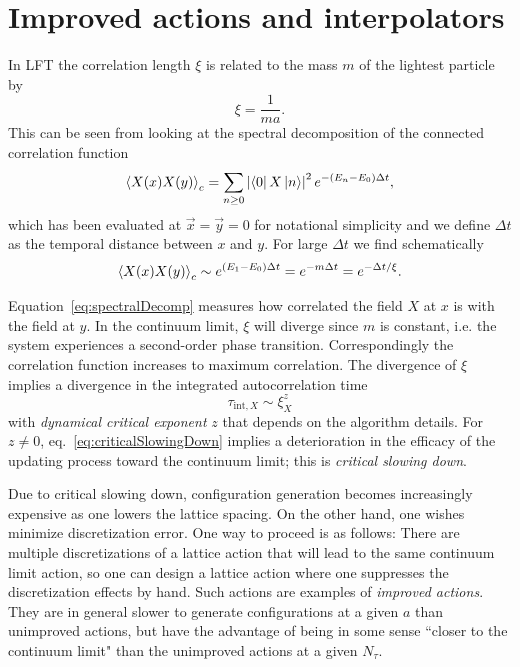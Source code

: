 \section{Improved actions and interpolators}

In LFT the correlation length $\xi$ is related to the mass $m$ of the lightest 
particle by
\begin{equation}
  \xi=\frac{1}{ma}.
\end{equation}
This can be seen from looking at the spectral decomposition of the
connected correlation function
\begin{equation}\label{eq:spectralDecomp}
  \ev{X(x)X(y)}_c=\sum_{n\geq 0} 
                   \left|\bra{0}X\ket{n}\right|^2
                    e^{-(E_n-E_0)\Delta t},
\end{equation}
which has been evaluated at $\vec{x}=\vec{y}=0$ for notational simplicity and
we define $\Delta t$ as the temporal distance between $x$ and $y$.
For large $\Delta t$ we find schematically
\begin{equation}
  \ev{X(x)X(y)}_c\sim e^{(E_1-E_0)\Delta t} =e^{-m\Delta t}=e^{-\Delta t/\xi}.
\end{equation}

Equation~\eqref{eq:spectralDecomp} measures how correlated the field 
$X$ at $x$ is with the field at $y$. In the continuum limit, $\xi$ will 
diverge since $m$ is constant, i.e. the system experiences a second-order 
phase transition. Correspondingly the correlation function increases to
maximum correlation. The divergence of $\xi$ implies a divergence in the
integrated autocorrelation time
\begin{equation}\label{eq:criticalSlowingDown}
  \tau_{\text{int}, X} \sim \xi_X^z
\end{equation}
with {\it dynamical critical exponent} $z$ that depends on the algorithm 
details. For $z\neq 0$, eq.~\eqref{eq:criticalSlowingDown} implies a
deterioration in the efficacy of the updating process toward the
continuum limit; this is {\it critical slowing down}.

Due to critical slowing down, configuration generation becomes increasingly
expensive as one lowers the lattice spacing.
On the other hand, one wishes minimize discretization error. One way to
proceed is as follows: There are multiple discretizations of a lattice action
that will lead to the same continuum limit action, so one can design a lattice
action where one suppresses the discretization effects by hand. Such actions
are examples of {\it improved actions}. They are in general slower to generate
configurations at a given $a$ than unimproved actions, but have the advantage
of being in some sense ``closer to the continuum limit" than the unimproved
actions at a given $N_\tau$.

